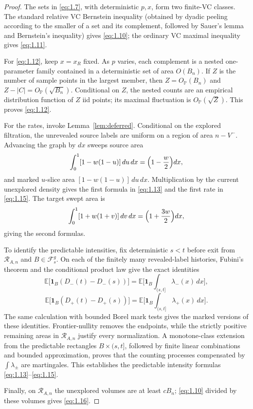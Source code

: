 \documentclass[11pt,reqno]{amsart}
\theoremstyle{definition}
\theoremstyle{remark}
\numberwithin{equation}{section}
\newcommand{\E}{\mathbb E}
\newcommand{\Pp}{\mathbb P}
\begin{document}
\begin{proof}
The sets in \eqref{eq:1.7}, with deterministic \(p,x\), form two finite-VC
classes.  The standard relative VC Bernstein inequality (obtained by
dyadic peeling according to the smaller of a set and its complement,
followed by Sauer's lemma and Bernstein's inequality) gives \eqref{eq:1.10};
the ordinary VC maximal inequality gives \eqref{eq:1.11}.

For \eqref{eq:1.12}, keep \(x=x_R\) fixed.  As \(p\) varies, each complement is
a nested one-parameter family contained in a deterministic set of area
\(O(B_n)\).  If \(Z\) is the number of sample points in the largest
member, then \(Z=O_{\Pp}(B_n)\) and
\(Z-|C|=O_{\Pp}(\sqrt{B_n})\).  Conditional on \(Z\), the nested counts
are an empirical distribution function of \(Z\) iid points; its maximal
fluctuation is \(O_{\Pp}(\sqrt Z)\).  This proves \eqref{eq:1.12}.

For the rates, invoke Lemma~\ref{lem:deferred}.  Conditional on the
explored filtration, the unrevealed source labels are uniform on a region
of area \(n-V^-\).  Advancing the graph by \(dx\) sweeps source area
\[
\int_0^1[1-w(1-u)]\,du\,dx
=
\Bigl(1-\frac w2\Bigr)dx,
\]
and marked \(u\)-slice area
\([1-w(1-u)]\,du\,dx\).  Multiplication by the current unexplored
density gives the first formula in \eqref{eq:1.13} and the first rate in
\eqref{eq:1.15}.  The target swept area is
\[
\int_0^1[1+w(1+v)]\,dv\,dx
=
\Bigl(1+\frac{3w}{2}\Bigr)dx,
\]
giving the second formulas.

To identify the predictable intensities, fix deterministic \(s<t\) before exit from
\(\mathcal R_{A,n}\) and \(B\in\mathcal F_s^g\).  On each of the finitely many
revealed-label histories, Fubini's theorem and the conditional product law give
the exact identities
\[
\E\bigl[\mathbf 1_B(D_-(t)-D_-(s))\bigr]
=
\E\biggl[\mathbf 1_B\int_{(s,t]}\lambda_-(x)\,dx\biggr],
\]
\begin{equation}
\E\bigl[\mathbf 1_B(D_+(t)-D_+(s))\bigr]
=
\E\biggl[\mathbf 1_B\int_{(s,t]}\lambda_+(x)\,dx\biggr].
\label{eq:1.15a}
\end{equation}
The same calculation with bounded Borel mark tests gives the marked versions
of these identities.  Frontier-nullity removes the endpoints, while the
strictly positive remaining areas in \(\mathcal R_{A,n}\) justify every
normalization.  A monotone-class extension from the predictable rectangles
\(B\times(s,t]\), followed by finite linear combinations and bounded
approximation, proves that the counting processes compensated by
\(\int\lambda_\pm\) are martingales.  This establishes the predictable
intensity formulas \eqref{eq:1.13}--\eqref{eq:1.15}.

Finally, on \(\mathcal R_{A,n}\) the
unexplored volumes are at least \(cB_n\); \eqref{eq:1.10} divided by these
volumes gives \eqref{eq:1.16}.
\end{proof}
\end{document}
